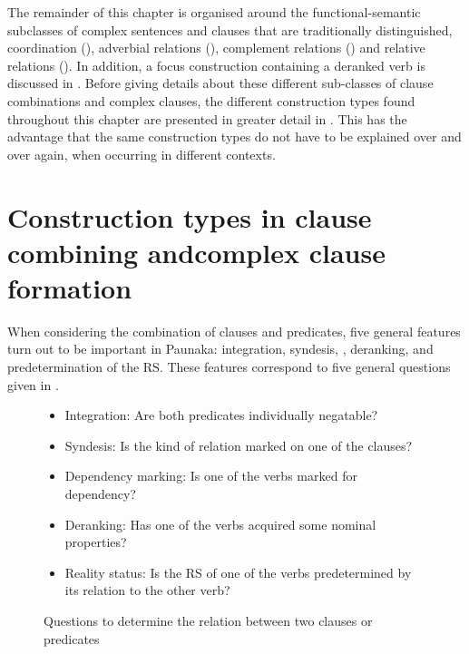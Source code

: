 The remainder of this chapter is organised around the functional-semantic subclasses of complex sentences and clauses that are traditionally distinguished, coordination (), adverbial relations (), complement relations () and relative relations (). In addition, a focus construction containing a deranked verb is discussed in . Before giving details about these different sub-classes of clause combinations and complex clauses, the different construction types found throughout this chapter are presented in greater detail in . This has the advantage that the same construction types do not have to be explained over and over again, when occurring in different contexts.

\section[Construction types in clause combining and complex clause formation]{Construction types in clause combining and\newline complex clause formation}\label{sec:TypesClauseCombining}

When considering the combination of clauses and predicates, five general features turn out to be important in Paunaka: integration, syndesis, , deranking, and predetermination of the RS. These features correspond to five general questions given in .

\begin{figure}[!ht]
\centering
\begin{center}
\begin{itemize}
\item Integration: Are both predicates individually negatable?
\item Syndesis: Is the kind of relation marked on one of the clauses?
\item Dependency marking: Is one of the verbs marked for dependency?
\item Deranking: Has one of the verbs acquired some nominal properties?
\item Reality status: Is the RS of one of the verbs predetermined by its relation to the other verb?
\end{itemize}
\caption{Questions to determine the relation between two clauses or predicates}
\label{fig:SubordinationQuestions}
\end{center}
\end{figure}


